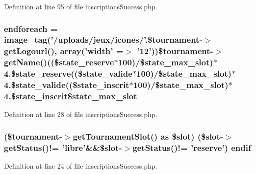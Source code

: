 Definition at line 95 of file inscriptions\-Success.\-php.

\hypertarget{inscriptions_success_8php_a672d9707ef91db026c210f98cc601123}{
\subsubsection[{endforeach}]{\setlength{\rightskip}{0pt plus 5cm}endforeach = image\-\_\-tag('/uploads/jeux/icones/'.\$tournament-\/$>${\bf get\-Logourl}(), array('width' =$>$ '12'))\$tournament-\/$>$get\-Name()((\$state\-\_\-reserve$\ast$100)/\$state\-\_\-max\-\_\-slot)$\ast$4.\$state\-\_\-reserve((\$state\-\_\-valide$\ast$100)/\$state\-\_\-max\-\_\-slot)$\ast$4.\$state\-\_\-valide((\$state\-\_\-inscrit$\ast$100)/\$state\-\_\-max\-\_\-slot)$\ast$4.\$state\-\_\-inscrit\$state\-\_\-max\-\_\-slot}}\label{inscriptions_success_8php_a672d9707ef91db026c210f98cc601123}


Definition at line 28 of file inscriptions\-Success.\-php.

\hypertarget{inscriptions_success_8php_aad37429372b77b04e6ea45a3acb9bee3}{
\subsubsection[{endif}]{ (\$tournament-\/$>$get\-Tournament\-Slot() as \$slot) (\$slot-\/$>$get\-Status()!= 'libre'\&\&\$slot-\/$>$get\-Status()!= 'reserve') endif}}\label{inscriptions_success_8php_aad37429372b77b04e6ea45a3acb9bee3}


Definition at line 24 of file inscriptions\-Success.\-php.

